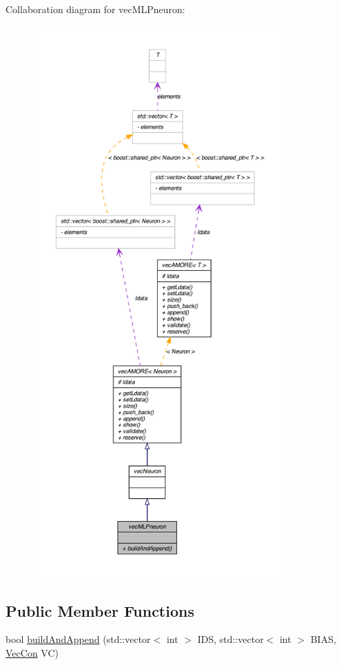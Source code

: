 Collaboration diagram for vecMLPneuron:\nopagebreak
\begin{figure}[H]
\begin{center}
\leavevmode
\includegraphics[height=600pt]{classvec_m_l_pneuron__coll__graph}
\end{center}
\end{figure}
\subsection*{Public Member Functions}
\begin{DoxyCompactItemize}
\item 
bool \hyperlink{classvec_m_l_pneuron_a8f9e8ee0deffd9eaafe25d4d3e3ebb3f}{buildAndAppend} (std::vector$<$ int $>$ IDS, std::vector$<$ int $>$ BIAS, \hyperlink{classvec_con}{VecCon} VC)
\end{DoxyCompactItemize}


